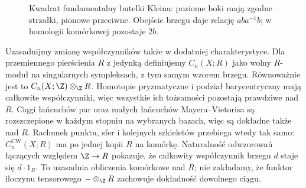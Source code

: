 \begin{figure}[!htbp]
\centering
{}
\caption{Kwadrat fundamentalny butelki Kleina: poziome boki
mają zgodne strzałki, pionowe przeciwne.
Obejście brzegu daje relację $aba^{-1}b$;
w homologii komórkowej pozostaje $2b$.}
\label{fig:homologia-butelka-kleina}
\end{figure}

\begin{uwaga}
\label{rem:homologia-wspolczynniki-przestrzeni}
Uzasadnijmy zmianę współczynników także w dodatniej charakterystyce.
Dla przemiennego pierścienia $R$ z jedynką definiujemy $C_n(X;R)$
jako wolny $R$-moduł na singularnych sympleksach, z tym samym wzorem brzegu.
Równoważnie jest to $C_n(X;\Z)\otimes_{\Z}R$.
Homotopie pryzmatyczne i podział barycentryczny mają całkowite współczynniki,
więc wszystkie ich tożsamości pozostają prawdziwe nad $R$.
Ciągi łańcuchów par oraz małych łańcuchów Mayera--Vietorisa są
rozszczepione w każdym stopniu na wybranych bazach, więc są dokładne także nad $R$.
Rachunek punktu, sfer i kolejnych szkieletów przebiega wtedy tak samo:
$C_n^{\mathrm{CW}}(X;R)$ ma po jednej kopii $R$ na komórkę.
Naturalność odwzorowań łączących względem $\Z\to R$ pokazuje,
że całkowity współczynnik brzegu $d$ staje się $d\cdot1_R$.
To uzasadnia obliczenia komórkowe nad $R$; nie zakładamy,
że funktor iloczynu tensorowego $-\otimes_{\Z}R$ zachowuje dokładność dowolnego ciągu.
\end{uwaga}


